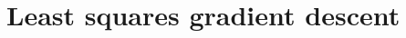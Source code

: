 \documentclass[../proj1_report.tex]{subfiles}
\begin{document}
\section{Least squares gradient descent}
\end{document}
